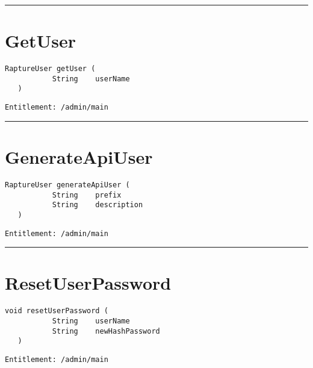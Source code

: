 \rule{12cm}{2pt}
\section{GetUser}
\label{Api:GetUser}
\begin{lstlisting}[style=nonumbers]
   RaptureUser getUser (
           String    userName
   )
\end{lstlisting}
\begin{Verbatim}[formatcom=\color{Maroon}]
  Entitlement: /admin/main
\end{Verbatim}



\rule{12cm}{2pt}
\section{GenerateApiUser}
\label{Api:GenerateApiUser}
\begin{lstlisting}[style=nonumbers]
   RaptureUser generateApiUser (
           String    prefix
           String    description
   )
\end{lstlisting}
\begin{Verbatim}[formatcom=\color{Maroon}]
  Entitlement: /admin/main
\end{Verbatim}



\rule{12cm}{2pt}
\section{ResetUserPassword}
\label{Api:ResetUserPassword}
\begin{lstlisting}[style=nonumbers]
   void resetUserPassword (
           String    userName
           String    newHashPassword
   )
\end{lstlisting}
\begin{Verbatim}[formatcom=\color{Maroon}]
  Entitlement: /admin/main
\end{Verbatim}



